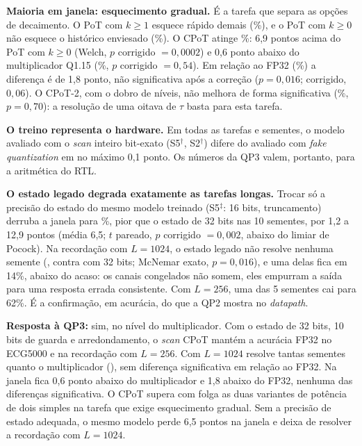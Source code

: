 \documentclass[12pt]{article}
\begin{document}
\textbf{Maioria em janela: esquecimento gradual.} É a tarefa que separa as opções de decaimento. O PoT com $k\geq1$ esquece rápido demais (\%), e o PoT com $k\geq0$ não esquece o histórico enviesado (\%). O CPoT atinge \%: 6,9 pontos acima do PoT com $k\geq0$ (Welch, $p$ corrigido $=0{,}0002$) e 0,6 ponto abaixo do multiplicador Q1.15 (\%, $p$ corrigido $=0{,}54$). Em relação ao FP32 (\%) a diferença é de 1,8 ponto, não significativa após a correção ($p=0{,}016$; corrigido, $0{,}06$). O CPoT-2, com o dobro de níveis, não melhora de forma significativa (\%, $p=0{,}70$): a resolução de uma oitava de $\tau$ basta para esta tarefa.

\textbf{O treino representa o hardware.} Em todas as tarefas e sementes, o modelo avaliado com o \emph{scan} inteiro bit-exato (S5$^\dagger$, S2$^\dagger$) difere do avaliado com \emph{fake quantization} em no máximo 0,1 ponto. Os números da QP3 valem, portanto, para a aritmética do RTL.

\textbf{O estado legado degrada exatamente as tarefas longas.} Trocar só a precisão do estado do mesmo modelo treinado (S5$^\ddagger$: 16 bits, truncamento) derruba a janela para \%, pior que o estado de 32 bits nas 10 sementes, por 1,2 a 12,9 pontos (média 6,5; $t$ pareado, $p$ corrigido $=0{,}002$, abaixo do limiar de Pocock). Na recordação com $L=1024$, o estado legado não resolve nenhuma semente (, contra  com 32 bits; McNemar exato, $p=0{,}016$), e uma delas fica em 14\%, abaixo do acaso: os canais congelados não somem, eles empurram a saída para uma resposta errada consistente. Com $L=256$, uma das 5 sementes cai para 62\%. É a confirmação, em acurácia, do que a QP2 mostra no \emph{datapath}.

\textbf{Resposta à QP3:} sim, no nível do multiplicador. Com o estado de 32 bits, 10 bits de guarda e arredondamento, o \emph{scan} CPoT mantém a acurácia FP32 no ECG5000 e na recordação com $L=256$. Com $L=1024$ resolve tantas sementes quanto o multiplicador (), sem diferença significativa em relação ao FP32. Na janela fica 0,6 ponto abaixo do multiplicador e 1,8 abaixo do FP32, nenhuma das diferenças significativa. O CPoT supera com folga as duas variantes de potência de dois simples na tarefa que exige esquecimento gradual. Sem a precisão de estado adequada, o mesmo modelo perde 6,5 pontos na janela e deixa de resolver a recordação com $L=1024$.
\end{document}
